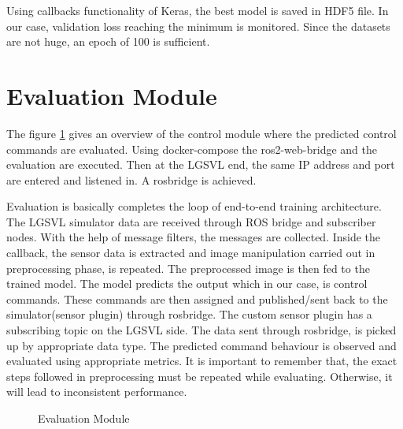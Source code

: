 Using callbacks functionality of Keras, the best model is saved in HDF5 file. In our case, validation
loss  reaching the minimum is monitored. Since the datasets are not huge, an epoch of 100
is sufficient.
\fi
\section{Evaluation Module}
The figure \ref{fig:evaluationfigure} gives an overview of the control module where the
predicted control commands are evaluated.
Using docker-compose the ros2-web-bridge and the evaluation are executed. Then at the
LGSVL end, the same IP address and port are entered and listened in. A rosbridge is
achieved.

Evaluation is basically completes the loop of end-to-end training architecture.  The LGSVL simulator data are received through ROS
bridge and subscriber nodes. With the help of message filters, the messages are collected.
Inside the callback, the sensor data is extracted and image manipulation carried out in preprocessing phase, is
repeated. The preprocessed image is then fed to the trained model. The model predicts the
output which in our case, is control commands. These commands are then assigned and published/sent
back to the simulator(sensor plugin) through rosbridge. The custom sensor plugin has a subscribing topic on the
LGSVL side. The data sent through rosbridge, is picked up by appropriate data type. The predicted command behaviour is observed and
evaluated using appropriate metrics. It is important to remember that, the exact steps followed
in preprocessing must be repeated while evaluating. Otherwise, it will lead to inconsistent
performance.

\begin{figure}[!ht]
	\centering
    \def\svgwidth{1\textwidth}
    \caption{Evaluation Module}
    \label{fig:evaluationfigure}
\end{figure}

